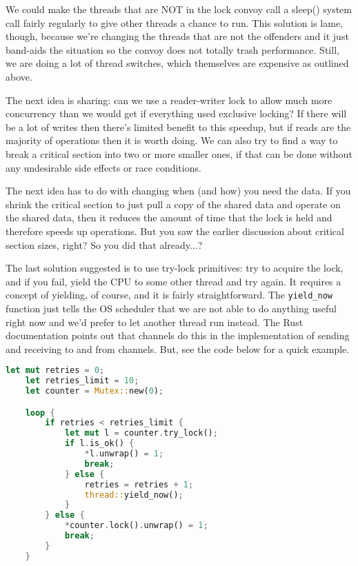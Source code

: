 We could make the threads that are NOT in the lock convoy call a sleep() system call fairly regularly to give other threads a chance to run. This solution is lame, though, because we're changing the threads that are not the offenders and it just band-aids the situation so the convoy does not totally trash performance. Still, we are doing a lot of thread switches, which themselves are expensive as outlined above.

The next idea is sharing: can we use a reader-writer lock to allow much more concurrency than we would get if everything used exclusive locking? If there will be a lot of writes then there's limited benefit to this speedup, but if reads are the majority of operations then it is worth doing. We can also try to find a way to break a critical section into two or more smaller ones, if that can be done without any undesirable side effects or race conditions.

The next idea has to do with changing when (and how) you need the data. If you shrink the critical section to just pull a copy of the shared data and operate on the shared data, then it reduces the amount of time that the lock is held and therefore speeds up operations. But you saw the earlier discussion about critical section sizes, right? So you did that already...?

The last solution suggested is to use try-lock primitives: try to acquire the lock, and if you fail, yield the CPU to some other thread and try again. It requires a concept of yielding, of course, and it is fairly straightforward. The \texttt{yield\_now} function just tells the OS scheduler that we are not able to do anything useful right now and we'd prefer to let another thread run instead. The Rust documentation points out that channels do this in the implementation of sending and receiving to and from channels. But, see the code below for a quick example.

\begin{lstlisting}[language=Rust]
    let mut retries = 0;
    let retries_limit = 10;
    let counter = Mutex::new(0);

    loop {
        if retries < retries_limit {
            let mut l = counter.try_lock();
            if l.is_ok() {
                *l.unwrap() = 1;
                break;
            } else {
                retries = retries + 1;
                thread::yield_now();
            }
        } else {
            *counter.lock().unwrap() = 1;
            break;
        }
    }
\end{lstlisting}

